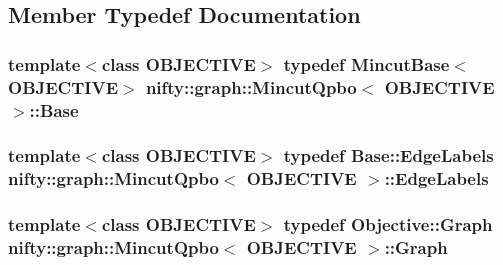 \subsection{Member Typedef Documentation}
\hypertarget{classnifty_1_1graph_1_1MincutQpbo_a1d73d1ad9b1e67507b740a1cece14f53}{}
\subsubsection[{Base}]{\setlength{\rightskip}{0pt plus 5cm}template$<$class O\+B\+J\+E\+C\+T\+I\+V\+E$>$ typedef {\bf Mincut\+Base}$<$O\+B\+J\+E\+C\+T\+I\+V\+E$>$ {\bf nifty\+::graph\+::\+Mincut\+Qpbo}$<$ O\+B\+J\+E\+C\+T\+I\+V\+E $>$\+::{\bf Base}}\label{classnifty_1_1graph_1_1MincutQpbo_a1d73d1ad9b1e67507b740a1cece14f53}
\hypertarget{classnifty_1_1graph_1_1MincutQpbo_ac2e16f00a684f1d286291ea6323100fc}{}
\subsubsection[{Edge\+Labels}]{\setlength{\rightskip}{0pt plus 5cm}template$<$class O\+B\+J\+E\+C\+T\+I\+V\+E$>$ typedef {\bf Base\+::\+Edge\+Labels} {\bf nifty\+::graph\+::\+Mincut\+Qpbo}$<$ O\+B\+J\+E\+C\+T\+I\+V\+E $>$\+::{\bf Edge\+Labels}}\label{classnifty_1_1graph_1_1MincutQpbo_ac2e16f00a684f1d286291ea6323100fc}
\hypertarget{classnifty_1_1graph_1_1MincutQpbo_a691cbebde5937ac4ca942a5ac2eecb92}{}
\subsubsection[{Graph}]{\setlength{\rightskip}{0pt plus 5cm}template$<$class O\+B\+J\+E\+C\+T\+I\+V\+E$>$ typedef Objective\+::\+Graph {\bf nifty\+::graph\+::\+Mincut\+Qpbo}$<$ O\+B\+J\+E\+C\+T\+I\+V\+E $>$\+::{\bf Graph}}\label{classnifty_1_1graph_1_1MincutQpbo_a691cbebde5937ac4ca942a5ac2eecb92}
\hypertarget{classnifty_1_1graph_1_1MincutQpbo_a6c5fd1d59ebe854e4aafec08563cd91c}{}
